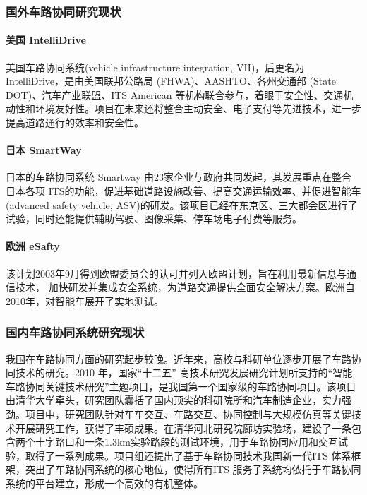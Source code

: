     \subsubsection{国外车路协同研究现状}

    \paragraph{美国 IntelliDrive} 美国车路协同系统(vehicle infrastructure integration, VII)，后更名为 IntelliDrive，是由美国联邦公路局 (FHWA)、AASHTO、各州交通部 (State DOT)、汽车产业联盟、ITS American 等机构联合参与，着眼于安全性、交通机动性和环境友好性\cite{陈超2010国内外车路协同系统发展现状综述}。项目在未来还将整合主动安全、电子支付等先进技术，进一步提高道路通行的效率和安全性。

    \paragraph{日本 SmartWay} 日本的车路协同系统 Smartway \cite{Hiroshi2005Smartway} 由23家企业与政府共同发起，其发展重点在整合日本各项 ITS的功能，促进基础道路设施改善、提高交通运输效率、并促进智能车(advanced safety vehicle, ASV)\cite{Chapman2010USING}的研发。该项目已经在东京区、三大都会区进行了试验，同时还能提供辅助驾驶、图像采集、停车场电子付费等服务。

    \paragraph{欧洲 eSafty} 该计划2003年9月得到欧盟委员会的认可并列入欧盟计划，旨在利用最新信息与通信技术，
    加快研发并集成安全系统，为道路交通提供全面安全解决方案。欧洲自2010年，对智能车展开了实地测试。

    \subsubsection{国内车路协同系统研究现状}
    我国在车路协同方面的研究起步较晚。近年来，高校与科研单位逐步开展了车路协同技术的研究\cite{Tian2010A,Danno2009VEHICLE,王祺2009一种基于车间通信的交通信息采集方法}。2010 年，国家“十二五” 高技术研究发展研究计划所支持的“智能车路协同关键技术研究”主题项目，是我国第一个国家级的车路协同项目。该项目由清华大学牵头，研究团队囊括了国内顶尖的科研院所和汽车制造企业，实力强劲。项目中，研究团队针对车车交互、车路交互、协同控制与大规模仿真等关键技术开展研究工作，获得了丰硕成果。在清华河北研究院廊坊实验场，建设了一条包含两个十字路口和一条1.3km实验路段的测试环境，用于车路协同应用和交互试验，取得了一系列成果。项目组还提出了基于车路协同技术我国新一代ITS 体系框架，突出了车路协同系统的核心地位，使得所有ITS 服务子系统均依托于车路协同系统的平台建立，形成一个高效的有机整体。

